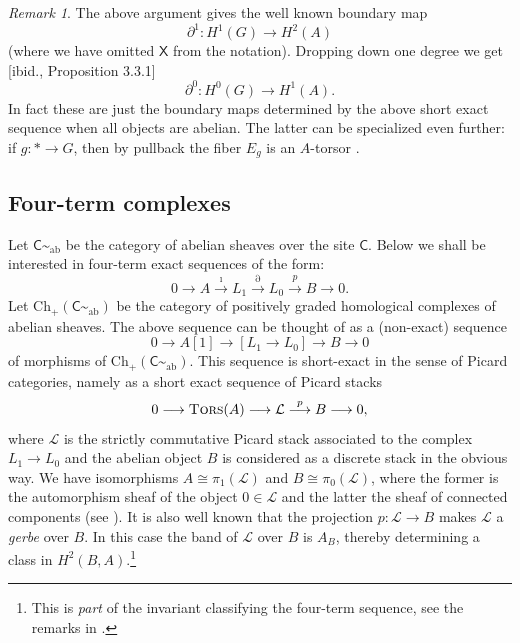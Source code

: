 \documentclass{amsart}
\numberwithin{equation}{subsection}
\theoremstyle{remark}
\newtheorem{remark}[theorem]{Remark}
\theoremstyle{remark}
\newcommand{\too}{\longrightarrow}%
\newcommand{\cL}{\mathcal{L}}
\newcommand{\C}{\mathsf{C}} %
\newcommand{\ch}{\mathrm{Ch}} %
\newcommand{\iso}{\cong}
\newcommand{\shC}{\C\sptilde} %
\newcommand{\shAbC}{\shC_\mathrm{ab}} %
\DeclareMathOperator{\tors}{\textsc{Tors}} %
\newcommand{\X}{\mathsf{X}} %
\begin{document}
\begin{remark}
  \label{rem:2}
  The above argument gives the well known boundary map \cite[Proposition 4.3.4]{Giraud}
  \begin{equation*}
    \partial^1\colon H^1(G) \too H^2(A)
  \end{equation*}
  (where we have omitted $\X$ from the notation). Dropping down one degree we get [ibid., Proposition 3.3.1]
  \begin{equation*}
    \partial^0\colon H^0(G) \too H^1(A).
  \end{equation*}
  In fact these are just the boundary maps determined by the above short exact sequence when all objects are abelian.  The latter can be specialized even further: if $g\colon *\to G$, then by pullback the fiber $E_g$ is an $A$-torsor \cite{GrothendieckSGA7}.
\end{remark}

\subsection{Four-term complexes}
\label{four-term}

Let $\shAbC$ be the category of abelian sheaves over the site $\C$. Below we shall be interested in four-term exact sequences of the form:
\begin{equation}
  \label{eq:6}
  0 \too A \overset{\imath}{\too} L_1\overset{\partial}{\too}
  L_0 \overset{p}{\too} B\too 0.
\end{equation}
Let $\ch_+(\shAbC)$ be the category of positively graded homological complexes of abelian sheaves. The above sequence can be thought of as a (non-exact) sequence 
\begin{equation*}
  0 \too A[1] \too [L_1\too L_0] \too B \too 0
\end{equation*}
of morphisms of $\ch_+(\shAbC)$. This sequence is short-exact in the sense of Picard categories, namely as a short exact sequence of Picard stacks
\begin{equation*}
  0 \too \tors(A) \too \cL \overset{p}{\too} B\too 0,
\end{equation*}
where $\cL$ is the strictly commutative Picard stack associated to the complex $L_1\to L_0$ and the abelian object $B$ is considered as a discrete stack in the obvious way. We have isomorphisms $A\iso \pi_1(\cL)$ and $B \iso \pi_0(\cL)$, where the former is the automorphism sheaf of the object $0\in \cL$ and the latter the sheaf of connected components (see \cite{Breen94,Breen99,DeligneDG}). It is also well known that the projection $p\colon \cL\to B$ makes $\cL$ a \emph{gerbe} over $B$. In this case the band of $\cL$ over $B$ is $A_B$, thereby determining a class in $H^2(B,A)$.\footnote{This is \emph{part} of the invariant classifying the four-term sequence, see the remarks in \cite[\S 6]{Breen99}.}
\end{document}
